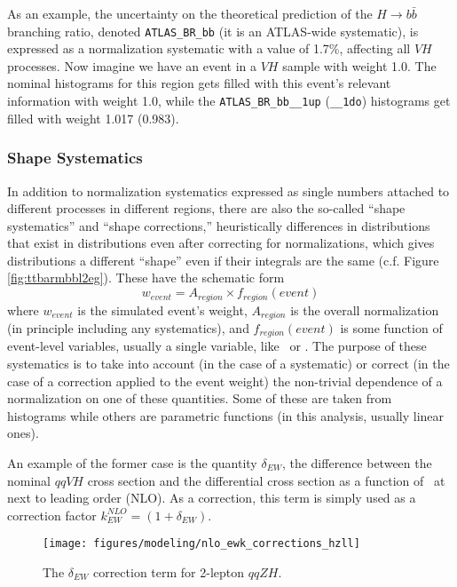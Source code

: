 As an example, the uncertainty on the theoretical prediction of the $H\to b\bar{b}$ branching ratio, denoted \texttt{ATLAS\_BR\_bb} (it is an ATLAS-wide systematic), is expressed as a normalization systematic with a value of 1.7\%, affecting all $VH$ processes.  Now imagine we have an event in a $VH$ sample with weight 1.0.  The nominal histograms for this region gets filled with this event's relevant information with weight 1.0, while the \texttt{ATLAS\_BR\_bb\_\_1up} (\texttt{\_\_1do}) histograms get filled with weight 1.017 (0.983).

\subsubsection{Shape Systematics}
\label{sec:shapesys}
In addition to normalization systematics expressed as single numbers attached to different processes in different regions, there are also the so-called ``shape systematics'' and ``shape corrections,'' heuristically differences in distributions that exist in distributions even after correcting for normalizations, which gives distributions a different ``shape'' even if their integrals are the same (c.f. Figure \ref{fig:ttbarmbbl2eg}).  These have the schematic form
\begin{equation}
\label{eqn:shapesys}
w_{event} = A_{region}\times f_{region}\left(event\right)
\end{equation}
where $w_{event}$ is the simulated event's weight, $A_{region}$ is the overall normalization (in principle including any systematics), and $f_{region}\left(event\right)$ is some function of event-level variables, usually a single variable, like \ptv\, or \mbb.  The purpose of these systematics is to take into account (in the case of a systematic) or correct (in the case of a correction applied to the event weight) the non-trivial dependence of a normalization on one of these quantities.  Some of these are taken from histograms while others are parametric functions (in this analysis, usually linear ones).

An example of the former case is the quantity $\delta_{EW}$, the difference between the nominal $qqVH$ cross section and the differential cross section as a function of \ptv\, at next to leading order (NLO).  As a correction, this term is simply used as a correction factor $k_{EW}^{NLO}=\left(1+\delta_{EW}\right)$.  
\begin{figure}[!htbp]\captionsetup{justification=centering}
  \centering
  \centering\texttt{[image: figures/modeling/nlo\_ewk\_corrections\_hzll]}
  \caption{The $\delta_{EW}$ correction term for 2-lepton $qqZH$.}
  \label{fig:nloewkdelta}
\end{figure}

